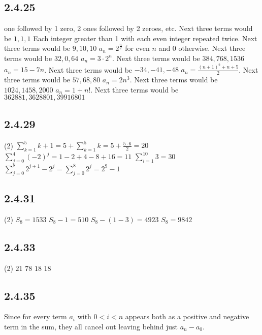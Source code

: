 \documentclass[12pt,titlepage]{extarticle}
\begin{document}
\subsection*{2.4.25}
\begin{tasks}
     one followed by 1 zero, 2 ones followed by 2 zeroes, etc. Next three terms would be $1,1,1$
    \task Each integer greater than 1 with each even integer repeated twice. Next three terms would be $9, 10, 10$
    \task $a_n = 2^{\frac{n}{2}}$ for even $n$ and $0$ otherwise. Next three terms would be $32, 0, 64$
    \task $a_n = 3 \cdot 2^n$. Next three terms would be $384, 768, 1536$
    \task $a_n = 15 - 7n$. Next three terms would be $-34, -41, -48$
    \task $a_n = \frac{(n+1)^2 + n + 5}{2}$. Next three terms would be $57, 68, 80$
    \task $a_n = 2n^3$. Next three terms would be $1024, 1458, 2000$
    \task $a_n = 1 + n!$. Next three terms would be $362881, 3628801, 39916801$
\end{tasks}

\subsection*{2.4.29}
\begin{tasks}(2)
    \task $\displaystyle \sum_{k=1}^5 k + 1 = 5 + \sum_{k = 1}^5 k = 5 + \frac{5\cdot 6}{2} = 20$
    \task $\displaystyle \sum_{j=0}^4 (-2)^j = 1 - 2 + 4 - 8 + 16 = 11$
    \task $\displaystyle \sum_{i=1}^{10} 3 = 30$
    \task $\displaystyle \sum_{j=0}^8 2^{j+1} - 2^j = \sum_{j=0}^8 2^j = 2^9 - 1$
\end{tasks}

\subsection*{2.4.31}
\begin{tasks}(2)
    \task $S_8 = 1533$
    \task $S_8 - 1 = 510$
    \task $S_8 - (1 - 3) = 4923$
    \task $S_8 = 9842$
\end{tasks}

\subsection*{2.4.33}
\begin{tasks}(2)
    \task $21$
    \task $78$
    \task $18$
    \task $18$
\end{tasks}

\subsection*{2.4.35}
Since for every term $a_i$ with $0 < i < n$ appears both as a positive and negative term in the sum, they all cancel out leaving behind just $a_n - a_0$.
\end{document}
